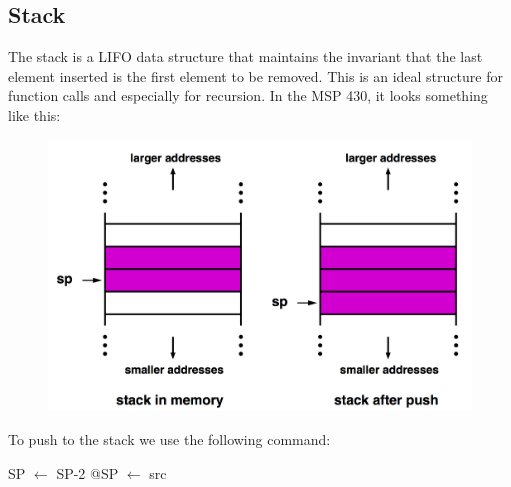 \documentclass{hw}
\begin{document}
\subsection{Stack}
The stack is a LIFO data structure that maintains the invariant that the last 
element inserted is the first element to be removed. This is an ideal structure
for function calls and especially for recursion. In the MSP 430, it looks something
like this:
\begin{figure}[H]
  \centering
  \includegraphics[scale=.4]{stack}
\end{figure}
To push to the stack we use the following command:
\begin{C}
  SP $\leftarrow$ SP-2
  @SP $\leftarrow$ src
\end{C}
\end{document}
